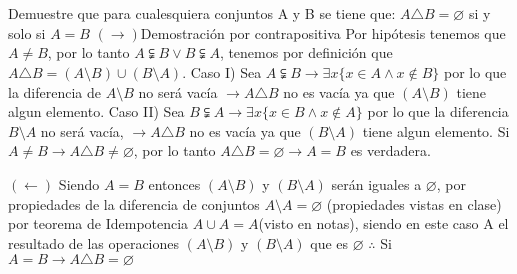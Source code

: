 \section{}
Demuestre que para cualesquiera conjuntos A y B se tiene que: $A \triangle B = \varnothing$ si y solo si $A = B$\newline
$(\rightarrow)$Demostración por contrapositiva\newline
Por hipótesis tenemos que $A \neq B$, por lo tanto $A \subsetneqq B \lor B \subsetneqq A$, tenemos por definición que $A \triangle B = (A \setminus B) \cup (B \setminus A)$.\newline
Caso I) Sea $A \subsetneqq B \rightarrow \exists x \{ x \in A \wedge x \notin B \}$ por lo que la diferencia de $A \setminus B$ no será vacía $\rightarrow A \triangle B$ no es vacía ya que $(A \setminus B)$ tiene algun elemento.\newline
Caso II) Sea $B \subsetneqq A \rightarrow \exists x \{ x \in B \wedge x \notin A \}$ por lo que la diferencia $B \setminus A$ no será vacía, $\rightarrow A \triangle B$ no es vacía ya que $(B \setminus A)$ tiene algun elemento.\newline
Si $A \neq B \rightarrow A \triangle B \neq \varnothing$, por lo tanto $A \triangle B = \varnothing \rightarrow A = B$ es verdadera.\newline

$(\leftarrow)$\newline
Siendo $A = B$ entonces $(A \setminus B)$ y $(B \setminus A)$ serán iguales a $\varnothing$, por propiedades de la diferencia de conjuntos $A \setminus A = \varnothing$ (propiedades vistas en clase) por teorema de Idempotencia $A \cup A = A$(visto en notas), siendo en este caso A el resultado de las operaciones $(A \setminus B)$ y $(B \setminus A)$ que es $\varnothing$\newline
$\therefore$ Si $A = B \rightarrow A \triangle B = \varnothing$